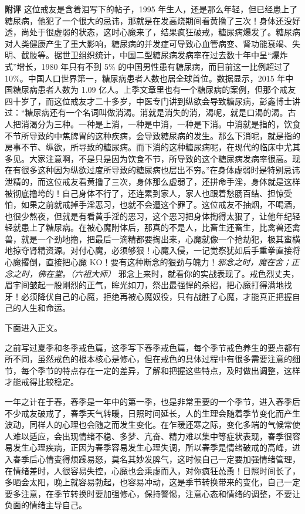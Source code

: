 \begin{case}
    \textbf{附评} 这位戒友是含着泪写下的帖子，1995 年生人，还是那么年轻，但已经患上了糖尿病，他犯了一个很大的忌讳，那就是在发高烧期间看黄撸了三次！身体还没好透，尚处于很虚弱的状态，这时心魔来了，结果疯狂破戒，糖尿病爆发了。糖尿病对人类健康产生了重大影响，糖尿病的并发症可导致心血管病变、肾功能衰竭、失明、截肢等。据世卫组织统计，中国二型糖尿病发病率在过去数十年中呈“爆炸式”增长，1980 年只有不到 5\% 的中国男性患有糖尿病，而目前这一比例超过了 10\%。中国人口世界第一，糖尿病患者人数也居全球首位。数据显示，2015 年中国糖尿病患者人数为 1.09 亿人。上季文章里也有一个糖尿病的案例，但那个戒友四十岁了，而这位戒友才二十多岁，中医专门讲到纵欲会导致糖尿病，彭鑫博士讲过：“糖尿病还有一个名词叫做消渴。消就是消失的消，渴呢，就是口渴的渴。古人把消渴分为三种。一种是上消，一种是中消，一种是下消。中消就是指的，饮食不节所导致的中焦脾胃的这种疾病，会导致糖尿病的发生。那么下消呢，就是指的房事不节、纵欲，所导致的糖尿病。而下消的这种糖尿病呢，在现代的临床中尤其多见。大家注意啊，不是只是因为饮食不节，所导致的这个糖尿病发病率很高。现在有很多这种因为纵欲过度所导致的糖尿病也层出不穷。”在身体虚弱时是特别忌讳泄精的，而这位戒友看黄撸了三次，身体那么虚弱了，还拼命手淫，身体就是这样被彻底撸垮的！自己身体不行了，还连累到家人，家人也跟着愁肠百结、担惊受怕，如果之前就戒掉手淫恶习，也就不会遭这个罪了。这位戒友不抽烟，不喝酒，也很少熬夜，但就是有看黄手淫的恶习，这个恶习把身体掏得太狠了，让他年纪轻轻就患上了糖尿病。在被心魔附体后，那真的不是人，比畜生还畜生，比禽兽还禽兽，就是一个劲地撸，把最后一滴精都要掏出来，心魔就像一个抢劫犯，极其蛮横地掠夺肾精资源。对付心魔，必须够狠！心魔入侵，一记觉察犹如后手重拳直接将心魔撂倒，直接把心魔 KO！要有这种断念的狠劲与魄力！\textit{邪念之时，魔在舍；正念之时，佛在堂。（六祖大师）} 邪念上来时，就看你的实战表现了。戒色烈丈夫，眉宇间皱起一股刚烈的正气，眸光如刀，祭出最强悍的杀招，把心魔打得满地找牙！必须降伏自己的心魔，拒绝再被心魔奴役，只有战胜了心魔，才能真正把握自己的人生和命运。
\end{case}

下面进入正文。

之前写过夏季和冬季戒色篇，这季写下春季戒色篇，每个季节戒色养生的要点都有所不同，虽然戒色的根本核心是修心，但在戒色的具体过程中有很多需要注意的细节，每个季节的特点存在一定的差异，了解和把握这些特点，及时做出调整，这样才能戒得比较稳定。

一年之计在于春，春季是一年中的第一季，也是非常重要的一个季节，进入春季后不少戒友破戒了，春季天气转暖，日照时间延长，人的生理会随着季节变化而产生波动，同样人的心理也会随之而发生变化。在乍暖还寒之际，变化多端的气候常使人难以适应，会出现情绪不稳、多梦、亢奋、精力难以集中等症状表现，春季很容易发生心理疾病，正因为春季容易发生心理失调，所以春季是情绪破戒的高峰，进入春季后心情变得烦躁易怒，莫名其妙发脾气，这时候自己一定要加强情绪管理，在情绪差时，人很容易失控，心魔也会乘虚而入，对你疯狂怂恿！日照时间长了，多晒会太阳，晚上就容易勃起，也容易冲动，这是季节转换带来的变化，自己一定要多注意，在季节转换时要加强修心，保持警惕，注意心态和情绪的调整，不要让负面的情绪主导自己。

